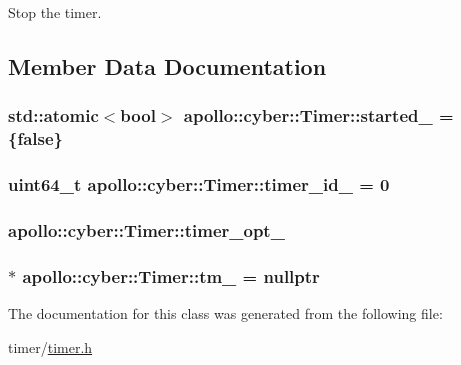Stop the timer. 



\subsection{Member Data Documentation}
\hypertarget{classapollo_1_1cyber_1_1Timer_abd2d33f780bda0a1f1fa36e52deb26ef}{
\subsubsection[{started\-\_\-}]{\setlength{\rightskip}{0pt plus 5cm}std\-::atomic$<$bool$>$ apollo\-::cyber\-::\-Timer\-::started\-\_\- = \{false\}\hspace{0.3cm}{\ttfamily [private]}}}\label{classapollo_1_1cyber_1_1Timer_abd2d33f780bda0a1f1fa36e52deb26ef}
\hypertarget{classapollo_1_1cyber_1_1Timer_acd0cde31c5d7213a99bb688b0d06ee66}{
\subsubsection[{timer\-\_\-id\-\_\-}]{\setlength{\rightskip}{0pt plus 5cm}uint64\-\_\-t apollo\-::cyber\-::\-Timer\-::timer\-\_\-id\-\_\- = 0\hspace{0.3cm}{\ttfamily [private]}}}\label{classapollo_1_1cyber_1_1Timer_acd0cde31c5d7213a99bb688b0d06ee66}
\hypertarget{classapollo_1_1cyber_1_1Timer_ac72f9500a21b1f8011de877da8840d9f}{
\subsubsection[{timer\-\_\-opt\-\_\-}]{ apollo\-::cyber\-::\-Timer\-::timer\-\_\-opt\-\_\-\hspace{0.3cm}{\ttfamily [private]}}}\label{classapollo_1_1cyber_1_1Timer_ac72f9500a21b1f8011de877da8840d9f}
\hypertarget{classapollo_1_1cyber_1_1Timer_a005fea5fb48bdee66ef0032d47f79714}{
\subsubsection[{tm\-\_\-}]{$\ast$ apollo\-::cyber\-::\-Timer\-::tm\-\_\- = nullptr\hspace{0.3cm}{\ttfamily [private]}}}\label{classapollo_1_1cyber_1_1Timer_a005fea5fb48bdee66ef0032d47f79714}


The documentation for this class was generated from the following file\-:\begin{DoxyCompactItemize}
\item 
timer/\hyperlink{timer_8h}{timer.\-h}\end{DoxyCompactItemize}
